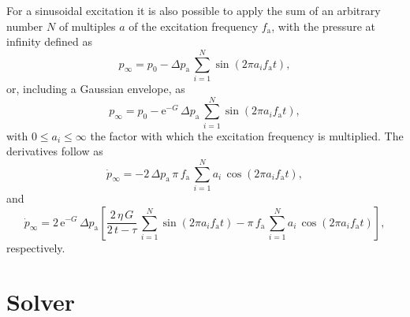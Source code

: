 For a sinusoidal excitation it is also possible to apply the sum of an arbitrary number $N$ of multiples $a$ of the excitation frequency $f_\text{a}$, with the pressure at infinity defined as
\begin{equation}
p_\infty = p_0 - \Delta p_\text{a} \, \sum_{i=1}^{N} \sin (2 \pi a_i f_\text{a} t),
\end{equation}
or, including a Gaussian envelope, as
\begin{equation}
p_\infty = p_0 - \text{e}^{-G} \, \Delta p_\text{a} \, \sum_{i=1}^{N} \sin (2 \pi a_i f_\text{a} t),
\end{equation}
with $0 \leq a_i \leq \infty$ the factor with which the excitation frequency is multiplied.
The derivatives follow as
\begin{equation}
\dot{p}_\infty = - 2 \, \Delta p_\text{a} \, \pi \, f_\text{a} \, \sum_{i=1}^{N} a_i \, \cos (2 \pi a_i f_\text{a} t),
\end{equation}
and
\begin{equation}
\dot{p}_\infty = 2 \, \text{e}^{-G} \, \Delta p_\text{a} \left[ \frac{2\, \eta  \, G}{2\, t-\tau} \, \sum_{i=1}^{N} \sin (2 \pi a_i f_\text{a} t) - \pi \, f_\text{a} \, \sum_{i=1}^{N} a_i \, \cos (2 \pi a_i f_\text{a} t) \right],
\end{equation}
respectively.



\section{Solver}